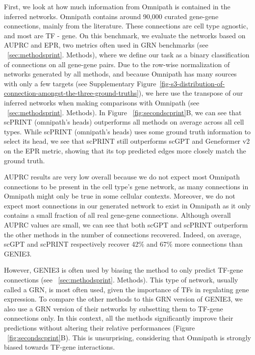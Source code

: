 First, we look at how much information from Omnipath is contained in the inferred networks. Omnipath contains around 90,000 curated gene-gene connections, mainly from the literature. These connections are cell type agnostic, and most are \gls{TF} - gene. On this benchmark, we evaluate the networks based on \gls{AUPRC} and \gls{EPR}, two metrics often used in \gls{GRN} benchmarks\citep{pratapaBenchmarkingAlgorithmsGene2020} (see ~\ref{sec:methodsprint}. Methods), where we define our task as a binary classification of connections on all gene-gene pairs. Due to the row-wise normalization of networks generated by all methods, and because Omnipath has many sources with only a few targets (see Supplementary Figure~\ref{fig-s3-distribution-of-connection-amongst-the-three-ground-truths}), we here use the transpose of our inferred networks when making comparisons with Omnipath (see ~\ref{sec:methodsprint}. Methods).
In Figure ~\ref{fig:secondscprint}B, we can see that \gls{scPRINT} (omnipath's heads) outperforms all methods on average across all cell types. While \gls{scPRINT} (omnipath's heads) uses some ground truth information to select its head, we see that \gls{scPRINT} still outperforms \gls{scGPT} and Geneformer v2 on the \gls{EPR} metric, showing that its top predicted edges more closely match the ground truth. 

\gls{AUPRC} results are very low overall because we do not expect most Omnipath connections to be present in the cell type's gene network, as many connections in Omnipath might only be true in some cellular contexts. Moreover, we do not expect most connections in our generated network to exist in Omnipath as it only contains a small fraction of all real gene-gene connections. Although overall \gls{AUPRC} values are small, we can see that both \gls{scGPT} and \gls{scPRINT} outperform the other methods in the number of connections recovered. Indeed, on average, \gls{scGPT} and \gls{scPRINT} respectively recover 42\% and 67\% more connections than GENIE3.

However, GENIE3 is often used by biasing the method to only predict \gls{TF}-gene connections (see ~\ref{sec:methodsprint}. Methods). This type of network, usually called a \gls{GRN}, is most often used, given the importance of \gls{TF}s in regulating gene expression. To compare the other methods to this \gls{GRN} version of GENIE3, we also use a \gls{GRN} version of their networks by subsetting them to \gls{TF}-gene connections only. In this context, all the methods significantly improve their predictions without altering their relative performances (Figure ~\ref{fig:secondscprint}B). This is unsurprising, considering that Omnipath is strongly biased towards \gls{TF}-gene interactions. 

